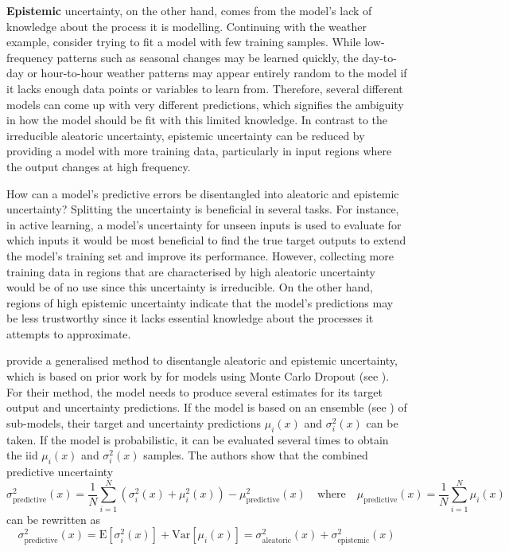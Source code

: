 \textbf{Epistemic} uncertainty, on the other hand, comes from the model's lack of knowledge about the process it is modelling. Continuing with the weather example, consider trying to fit a model with few training samples. While low-frequency patterns such as seasonal changes may be learned quickly, the day-to-day or hour-to-hour weather patterns may appear entirely random to the model if it lacks enough data points or variables to learn from. Therefore, several different models can come up with very different predictions, which signifies the ambiguity in how the model should be fit with this limited knowledge. In contrast to the irreducible aleatoric uncertainty, epistemic uncertainty can be reduced by providing a model with more training data, particularly in input regions where the output changes at high frequency.

\newpar How can a model's predictive errors be disentangled into aleatoric and epistemic uncertainty? Splitting the uncertainty is beneficial in several tasks. For instance, in active learning, a model's uncertainty for unseen inputs is used to evaluate for which inputs it would be most beneficial to find the true target outputs to extend the model's training set and improve its performance. However, collecting more training data in regions that are characterised by high aleatoric uncertainty would be of no use since this uncertainty is irreducible. On the other hand, regions of high epistemic uncertainty indicate that the model's predictions may be less trustworthy since it lacks essential knowledge about the processes it attempts to approximate.

\textcite{uncertainty-disentanglement-2022} provide a generalised method to disentangle aleatoric and epistemic uncertainty, which is based on prior work by \textcite{bayesian-deep-uncertainty-2017} for models using Monte Carlo Dropout (see ). For their method, the model needs to produce several estimates for its target output and uncertainty predictions. If the model is based on an ensemble (see ) of sub-models, their target and uncertainty predictions $\mu_i(x)$ and $\sigma^2_i(x)$ can be taken. If the model is probabilistic, it can be evaluated several times to obtain the iid $\mu_i(x)$ and $\sigma^2_i(x)$ samples. The authors show that the combined predictive uncertainty
\begin{equation*}
    \sigma^2_{\text{predictive}}(x) = \frac{1}{N} \sum_{i=1}^{N} \left( \sigma^2_i(x) + \mu^2_i(x) \right) - \mu^2_{\text{predictive}}(x) \quad \text{where} \quad \mu_{\text{predictive}}(x) = \frac{1}{N} \sum_{i=1}^{N} \mu_i(x)
\end{equation*}
can be rewritten as
\begin{equation} \label{eq:uncertainty-disentanglement}
    \sigma^2_{\text{predictive}}(x) = \text{E}[ \sigma^2_i(x) ] + \text{Var}[ \mu_i(x) ] = \sigma^2_{\text{aleatoric}}(x) + \sigma^2_{\text{epistemic}}(x)
\end{equation}

